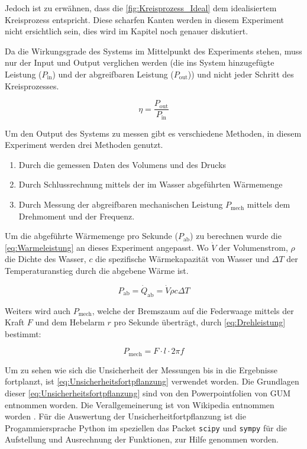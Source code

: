 \documentclass[11pt]{scrartcl}
\begin{document}
Jedoch ist zu erwähnen, dass die \autoref{fig:Kreisprozess_Ideal} dem  
idealisiertem Kreisprozess entspricht. Diese scharfen Kanten werden in
diesem Experiment nicht ersichtlich sein, dies wird im Kapitel 
noch genauer diskutiert.

Da die Wirkungsgrade des Systems im Mittelpunkt des Experiments stehen, muss
nur der Input und Output verglichen werden (die ins System hinzugefügte 
Leistung ($P_{\text{in}}$) und der abgreifbaren Leistung ($P_{\text{out}}$)) und nicht 
jeder Schritt des Kreisprozesses.

\begin{equation}
    \label{eq:Wirkungsgrad}
    \eta = \frac{P_{\text{out}}}{P_{\text{in}}}
\end{equation}

Um den Output des Systems zu messen gibt es verschiedene Methoden, in diesem
Experiment werden drei Methoden genutzt. 
\begin{enumerate}
    \item Durch die gemessen Daten des Volumens und des Drucks
    \item Durch Schlussrechnung mittels der im Wasser abgeführten Wärmemenge
    \item Durch Messung der abgreifbaren mechanischen Leistung $P_{\text{mech}}$ 
        mittels dem Drehmoment und der Frequenz.
\end{enumerate}

Um die abgeführte Wärmemenge pro Sekunde ($P_{\text{ab}}$) zu berechnen wurde die
\autoref{eq:Warmeleistung} \cite{dem13} an dieses Experiment angepasst. Wo $\dot V$ der
Volumenstrom, $\rho$ die Dichte des Wasser, $c$ die spezifische Wärmekapazität
von Wasser und $\Delta T$ der Temperaturanstieg durch die abgebene Wärme ist.

\begin{equation}
    \label{eq:Warmeleistung}
    P_{\text{ab}} = \dot Q_{\text{ab}} = \dot V \rho c \Delta T 
\end{equation}

Weiters wird auch $P_{\text{mech}}$, welche der Bremszaum auf die Federwaage
mittels der Kraft $F$ und dem Hebelarm $r$ pro Sekunde überträgt, durch
\autoref{eq:Drehleistung} bestimmt:

\begin{equation}
    \label{eq:Drehleistung}
    P_{\text{mech}} = F \cdot l \cdot 2 \pi f
\end{equation}

Um zu sehen wie sich die Unsicherheit der Messungen bis in die Ergebnisse 
fortplanzt, ist \autoref{eq:Unsicherheitsfortpflanzung} verwendet worden.
Die Grundlagen dieser \autoref{eq:Unsicherheitsfortpflanzung} sind von den Powerpointfolien von 
GUM entnommen worden.\cite{Kessel2004} Die Verallgemeinerung ist von Wikipedia entnommen
worden \cite{2020Fehler}.
Für die Auswertung der Unsicherheitfortpflanzung ist die Progammiersprache
Python im speziellen das Packet \verb#scipy# und \verb|sympy| für die
Aufstellung und Ausrechnung der Funktionen, zur Hilfe genommen worden.
\end{document}
